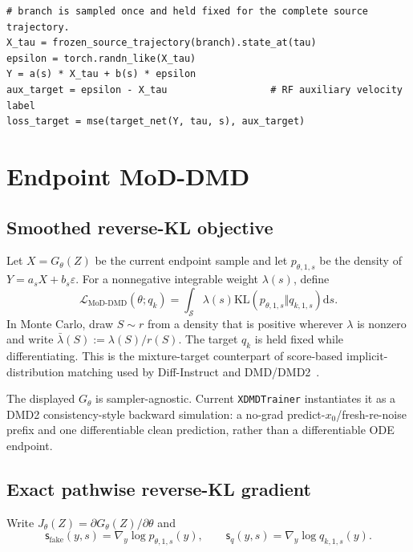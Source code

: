 \documentclass[11pt,a4paper]{article}
\newcommand{\KL}{\mathrm{KL}}
\newcommand{\dd}{\mathrm{d}}
\newcommand{\fake}{\mathrm{fake}}
\newcommand{\score}{\mathsf{s}}
\theoremstyle{plain}
\theoremstyle{definition}
\begin{document}
\begin{lstlisting}[style=goodpython,caption={Correct conceptual target-score sampling.}]
# branch is sampled once and held fixed for the complete source trajectory.
X_tau = frozen_source_trajectory(branch).state_at(tau)
epsilon = torch.randn_like(X_tau)
Y = a(s) * X_tau + b(s) * epsilon
aux_target = epsilon - X_tau                  # RF auxiliary velocity label
loss_target = mse(target_net(Y, tau, s), aux_target)
\end{lstlisting}

\section{Endpoint MoD-DMD}
\label{sec:mod-dmd}

\subsection{Smoothed reverse-KL objective}

Let $X=G_\theta(Z)$ be the current endpoint sample and let $p_{\theta,1,s}$ be the density of
$Y=a_sX+b_s\varepsilon$.  For a nonnegative integrable weight $\lambda(s)$, define
\begin{equation}
\mathcal L_{\mathrm{MoD\text{-}DMD}}(\theta;q_k)
=\int_{\mathcal S}\lambda(s)
\KL\!\left(p_{\theta,1,s}\Vert q_{k,1,s}\right)\dd s.
\label{eq:mod-dmd-objective}
\end{equation}
In Monte Carlo, draw $S\sim r$ from a density that is positive wherever $\lambda$ is nonzero and
write $\bar\lambda(S):=\lambda(S)/r(S)$.  The target $q_k$ is held fixed while differentiating.
This is the mixture-target counterpart of score-based implicit-distribution matching used by
Diff-Instruct and DMD/DMD2~\cite{diffinstruct,dmd,dmd2}.

The displayed $G_\theta$ is sampler-agnostic.  Current \texttt{XDMDTrainer} instantiates it as a
DMD2 consistency-style backward simulation: a no-grad predict-$x_0$/fresh-re-noise prefix and
one differentiable clean prediction, rather than a differentiable ODE endpoint.

\subsection{Exact pathwise reverse-KL gradient}

Write $J_\theta(Z)=\partial G_\theta(Z)/\partial\theta$ and
\[
\score_{\fake}(y,s)=\nabla_y\log p_{\theta,1,s}(y),
\qquad
\score_q(y,s)=\nabla_y\log q_{k,1,s}(y).
\]
\end{document}

